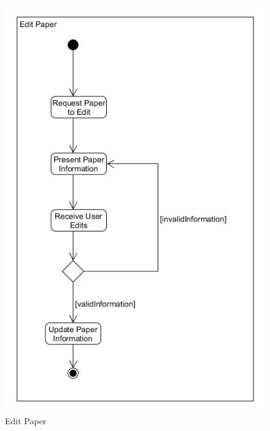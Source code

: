 \documentclass[a4paper,12pt]{article}
\begin{document}
\begin{figure}[H]
    \centering
    \caption{Edit Paper}
    \includegraphics[width=1\textwidth]{process-spec/Activity_EditPaper.jpg}
\end{figure}
\end{document}
